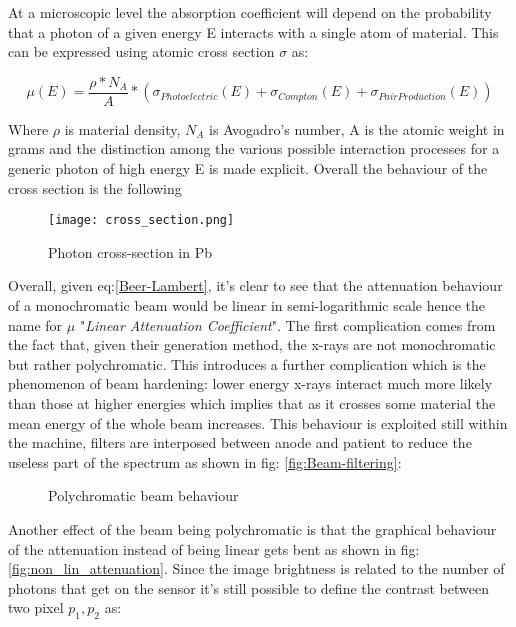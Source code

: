 At a microscopic level the absorption coefficient will depend on the probability that a photon of a given energy E interacts with a single atom of material. This can be expressed using atomic cross section $\sigma$ as:

\begin{equation}\label{Lin_att_coef_def}
\mu(E) = \frac{\rho*N_A}{A}*(\sigma_{Photoelectric}(E)+\sigma_{Compton}(E)+\sigma_{PairProduction}(E))
\end{equation}

Where $\rho$ is material density, $N_A$ is Avogadro's number, A is the atomic weight in grams and the distinction among the various possible interaction processes for a generic photon of high energy E is made explicit. Overall the behaviour of the cross section is the following

\begin{figure}[H]
\centering
  		\texttt{[image: cross\_section.png]}
        \caption{Photon cross-section in Pb\label{fig:Photon-Cross-sect}}
\end{figure}

Overall, given eq:\ref{Beer-Lambert}, it's clear to see that the attenuation behaviour of a monochromatic beam would be linear in semi-logarithmic scale hence the name for $\mu$ "\textit{Linear Attenuation Coefficient}". The first complication comes from the fact that, given their generation method, the x-rays are not monochromatic but rather polychromatic. This introduces a further complication which is the phenomenon of beam hardening: lower energy x-rays interact much more likely than those at higher energies which implies that as it crosses some material the mean energy of the whole beam increases. This behaviour is exploited still within the machine, filters are interposed between anode and patient to reduce the useless part of the spectrum as shown in fig: \ref{fig:Beam-filtering}:

\begin{figure}[H]
\centering
        \caption{Polychromatic beam behaviour}\label{fig:polychrom_behaviour}
\end{figure}

Another effect of the beam being polychromatic is that the graphical behaviour of the attenuation instead of being linear gets bent as shown in fig: \ref{fig:non_lin_attenuation}. Since the image brightness is related to the number of photons that get on the sensor it's still possible to define the contrast between two pixel $p_1, p_2$ as:


